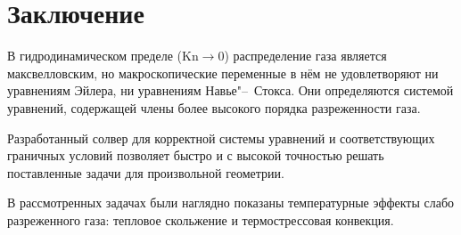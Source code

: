 \documentclass[english,russian,a4paper,10pt]{article}
\newcommand{\Kn}{\mathrm{Kn}}
\begin{document}
\section{Заключение}

В гидродинамическом пределе (\(\Kn\to0\)) распределение газа является максвелловским,
но макроскопические переменные в нём не удовлетворяют ни уравнениям Эйлера,
ни уравнениям Навье"--~Стокса. Они определяются системой уравнений,
содержащей члены более высокого порядка разреженности газа.

Разработанный солвер для корректной системы уравнений и соответствующих граничных условий
позволяет быстро и с высокой точностью решать поставленные задачи для произвольной геометрии.

В рассмотренных задачах были наглядно показаны температурные эффекты слабо разреженного газа:
тепловое скольжение и термострессовая конвекция.

\printbibliography
\end{document}
